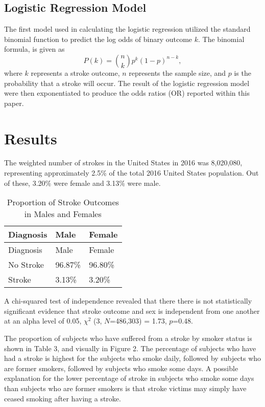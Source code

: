 \documentclass[11pt,]{article}
\begin{document}
\hypertarget{logistic-regression-model}{%
\subsection{Logistic Regression Model}\label{logistic-regression-model}}

The first model used in calculating the logistic regression utilized the
standard binomial function to predict the log odds of binary outcome
\(k\). The binomial formula, is given as
\[P(k)={n \choose k}p^{k}(1-p)^{n-k},\] where \(k\) represents a stroke
outcome, \(n\) represents the sample size, and \(p\) is the probability
that a stroke will occur. The result of the logistic regression model
were then exponentiated to produce the odds ratios (OR) reported within
this paper.

\hypertarget{results}{%
\section{Results}\label{results}}

The weighted number of strokes in the United States in 2016 was
8,020,080, representing approximately 2.5\% of the total 2016 United
States population. Out of these, 3.20\% were female and 3.13\% were
male.

\begin{longtable}[]{@{}lll@{}}
\caption{Proportion of Stroke Outcomes in Males and
Females}\tabularnewline
\toprule
Diagnosis & Male & Female\tabularnewline
\midrule
\endfirsthead
\toprule
Diagnosis & Male & Female\tabularnewline
\midrule
\endhead
No Stroke & 96.87\% & 96.80\%\tabularnewline
Stroke & 3.13\% & 3.20\%\tabularnewline
\bottomrule
\end{longtable}

A chi-squared test of independence revealed that there there is not
statistically significant evidence that stroke outcome and sex is
independent from one another at an alpha level of 0.05, \(\chi^2\) (3,
\(N\)=486,303) = 1.73, \(p\)=0.48.

The proportion of subjects who have suffered from a stroke by smoker
status is shown in Table 3, and visually in Figure 2. The percentage of
subjects who have had a stroke is highest for the subjects who smoke
daily, followed by subjects who are former smokers, followed by subjects
who smoke some days. A possible explanation for the lower percentage of
stroke in subjects who smoke some days than subjects who are former
smokers is that stroke victims may simply have ceased smoking after
having a stroke.
\end{document}
